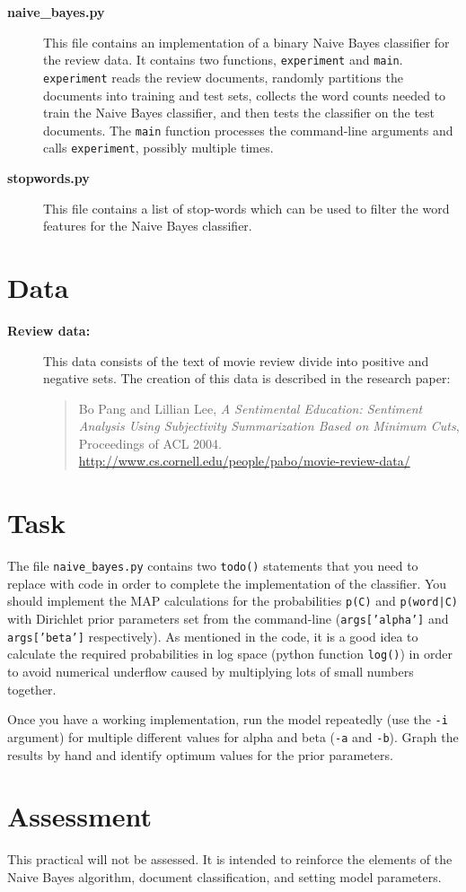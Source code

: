 \documentclass[11pt]{article}
\begin{document}
\begin{description}
\item[\bf naive\_bayes.py] 
This file contains an implementation of a binary Naive Bayes classifier for the review data. It contains two functions, {\tt experiment} and {\tt main}. {\tt experiment} reads the review documents, randomly partitions the documents into training and test sets, collects the word counts needed to train the Naive Bayes classifier, and then tests the classifier on the test documents.
The {\tt main} function processes the command-line arguments and calls {\tt experiment}, possibly multiple times.

\item[\bf stopwords.py] 
This file contains a list of stop-words which can be used to filter the word features for the Naive Bayes classifier.

\end{description}


\section*{Data}
\begin{description}
\item[\bf Review data:]
This data consists of the text of movie review divide into positive and negative sets. 
The creation of this data is described in the research paper:
\begin{quote}
Bo Pang and Lillian Lee, {\em A Sentimental Education: Sentiment Analysis Using Subjectivity Summarization Based on Minimum Cuts}, Proceedings of ACL 2004. \\
{\footnotesize \url{http://www.cs.cornell.edu/people/pabo/movie-review-data/}}
\end{quote}
\end{description}

\section*{Task}
The file {\tt naive\_bayes.py} contains two {\tt todo()} statements that you need to replace with code in order to complete the implementation of the classifier. You should implement the MAP calculations for the probabilities {\tt p(C)} and {\tt p(word|C)} with Dirichlet prior parameters set from the command-line ({\tt args['alpha']} and {\tt args['beta']} respectively).
As mentioned in the code, it is a good idea to calculate the required probabilities in log space (python function {\tt log()}) in order to avoid numerical underflow caused by multiplying lots of small numbers together.

Once you have a working implementation, run the model repeatedly (use the {\tt -i} argument) for multiple different values for alpha and beta ({\tt -a} and {\tt -b}). Graph the results by hand and identify optimum values for the prior parameters.

\section*{Assessment}
This practical will not be assessed. It is intended to reinforce the elements of the Naive Bayes algorithm, document classification, and setting model parameters.
\end{document}
